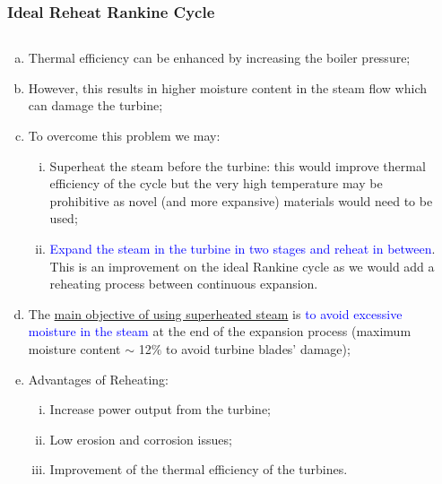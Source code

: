 \documentclass[10pt,compress]{beamer}
\newcommand{\blue}{\textcolor{blue}}
\begin{document}
\begin{frame}
 \frametitle{Ideal Reheat Rankine Cycle}
  \begin{columns}
     \begin{column}[c]{0.5\linewidth}
        \begin{enumerate}[(a)] \scriptsize
           \item<1-> Thermal efficiency can be enhanced by increasing the boiler pressure;
           \item<1-> However, this results in higher moisture content in the steam flow which can damage the turbine;
           \item<2-> To overcome this problem we may:
           \begin{enumerate}[(i)] \scriptsize
             \item<2-> Superheat the steam before the turbine: this would improve thermal efficiency of the cycle but the very high temperature may be prohibitive as novel (and more expansive) materials would need to be used;
             \item<2-> \blue{Expand the steam in the turbine in two stages and reheat in between}. This is an improvement on the ideal Rankine cycle as we would add a reheating process between continuous expansion.
           \end{enumerate}
           \item<3-> The \underline{main objective of using superheated steam} is \blue{to avoid excessive moisture in the steam} at the end of the expansion process (maximum moisture content $\sim$ 12$\%$ to avoid turbine blades' damage);
           \item<4-> Advantages of Reheating:
              \begin{enumerate}[(i)]\scriptsize
                 \item<4-> Increase power output from the turbine;
                 \item<4-> Low erosion and corrosion issues;
                 \item<4-> Improvement of the thermal efficiency of the turbines.
              \end{enumerate}
        \end{enumerate}
     \end{column}
     \begin{column}[c]{0.5\linewidth} 
\end{column}
\end{columns}
\end{frame}
\end{document}
